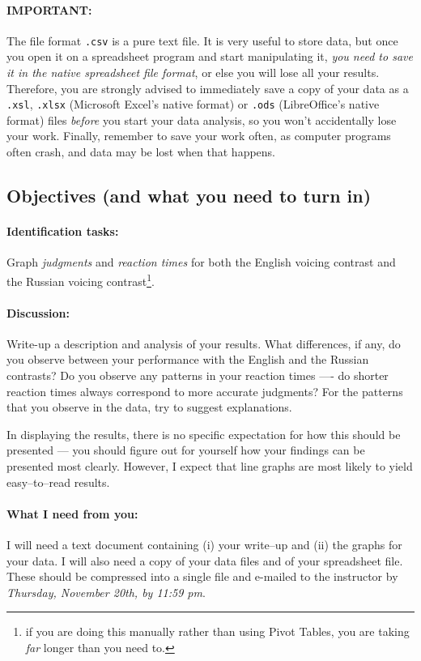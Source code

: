 \documentclass{article}
\newcommand{\soft}[1]{\textsf{#1}}
\newcommand{\filefmat}[1]{\texttt{#1}}
\newcommand{\MSExcel}{\soft{Microsoft\texttrademark{} Excel}}
\newcommand{\OpOff}{\soft{LibreOffice}}
\newcommand{\deadline}{\emph{Thursday, November 20th, by 11:59 pm}}
\begin{document}
\paragraph{IMPORTANT:} The file format \filefmat{.csv} is a pure text file. It is very useful to store data, but once you open it on a spreadsheet program and start manipulating it, \emph{you need to save it in the native spreadsheet file format}, or else you will lose all your results. Therefore, you are strongly advised to immediately save a copy of your data as a \filefmat{.xsl}, \filefmat{.xlsx} (\MSExcel{}'s native format) or \filefmat{.ods} (\OpOff{}'s native format) files \emph{before} you start your data analysis, so you won't accidentally lose your work. Finally, remember to save your work often, as computer programs often crash, and data may be lost when that happens.

\subsection{Objectives (and what you need to turn in)}

\paragraph{Identification tasks:} Graph \emph{judgments} and \emph{reaction times} for both the English voicing contrast and the Russian voicing contrast\footnote{if you are doing this manually rather than using Pivot Tables, you are taking \emph{far} longer than you need to.}.

\paragraph{Discussion:} Write-up a description and analysis of your results. What differences, if any, do you observe between your performance with the English and the Russian contrasts? Do you observe any patterns in your reaction times ---- do shorter reaction times always correspond to more accurate judgments? For the patterns that you observe in the data, try to suggest explanations.

In displaying the results, there is no specific expectation for how this should be presented --- you should figure out for yourself how your findings can be presented most clearly. However, I expect that line graphs are most likely to yield easy--to--read results.

\paragraph{What I need from you:} I will need a text document containing (i) your write--up and (ii) the graphs for your data. I will also need a copy of your data files and of your spreadsheet file. These should be compressed into a single file and e-mailed to the instructor by \deadline{}.
\end{document}
